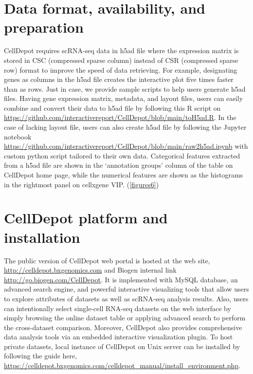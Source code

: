\documentclass[runningheads]{llncs}
\begin{document}
\hypertarget{data-format-availability-and-preparation}{%
\section{Data format, availability, and preparation}\label{data-format-availability-and-preparation}}

CellDepot requires scRNA-seq data in h5ad file where the expression matrix is stored in CSC (compressed sparse column) instead of CSR (compressed sparse row) format to improve the speed of data retrieving. For example, designating genes as columns in the h5ad file creates the interactive plot five times faster than as rows. Just in case, we provide sample scripts to help users generate h5ad files. Having gene expression matrix, metadata, and layout files, users can easily combine and convert their data to h5ad file by following this R script on \url{https://github.com/interactivereport/CellDepot/blob/main/toH5ad.R}. In the case of lacking layout file, users can also create h5ad file by following the Jupyter notebook \url{https://github.com/interactivereport/CellDepot/blob/main/raw2h5ad.ipynb} with custom python script tailored to their own data. Categorical features extracted from a h5ad file are shown in the `annotation groups' column of the table on CellDepot home page, while the numerical features are shown as the histograms in the rightmost panel on cellxgene VIP. (\ref{figures6})

\hypertarget{celldepot-platform-and-installation}{%
\section{CellDepot platform and installation}\label{celldepot-platform-and-installation}}

The public version of CellDepot web portal is hosted at the web site, \url{http://celldepot.bxgenomics.com} and Biogen internal link \url{http://go.biogen.com/CellDepot}. It is implemented with MySQL database, an advanced search engine, and powerful interactive visualizing tools that allow users to explore attributes of datasets as well as scRNA-seq analysis results. Also, users can intentionally select single-cell RNA-seq datasets on the web interface by simply browsing the online dataset table or applying advanced search to perform the cross-dataset comparison. Moreover, CellDepot also provides comprehensive data analysis tools via an embedded interactive visualization plugin. To host private datasets, local instance of CellDepot on Unix server can be installed by following the guide here, \url{https://celldepot.bxgenomics.com/celldepot_manual/install_environment.php}.
\end{document}
